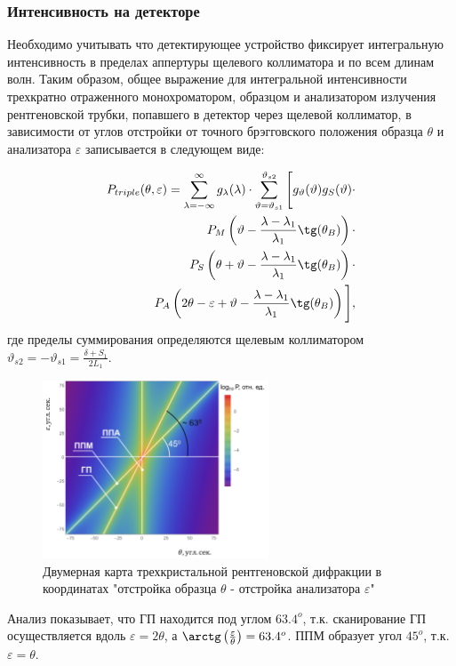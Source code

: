 \subsubsection*{Интенсивность на детекторе}

Необходимо учитывать что детектирующее устройство фиксирует интегральную интенсивность в пределах аппертуры
щелевого коллиматора и по всем длинам волн.
Таким образом, общее выражение для интегральной интенсивности трехкратно отраженного
монохроматором, образцом и анализатором излучения рентгеновской трубки, попавшего в детектор через
щелевой коллиматор, в зависимости от углов отстройки от точного брэгговского положения образца $\theta$ и
анализатора $\varepsilon$ записывается в следующем виде:

\begin{eqnarray} \label{eq:doudle_spectra_angle}
  P_{triple}(\theta,\varepsilon) = \sum_{\lambda = -\infty}^{\infty}g_{\lambda}(\lambda)\cdot
  \sum_{\vartheta = \vartheta_{s1}}^{\vartheta_{s2}} \Bigg[ g_{\vartheta}(\vartheta) g_{S}(\vartheta) \cdot \nonumber \\
    P_M \left(\vartheta - \frac{\lambda - \lambda_1}{\lambda_1}\tg(\theta_B) \right) \cdot \nonumber \\
   P_S \left(\theta + \vartheta - \frac{\lambda - \lambda_1}{\lambda_1}\tg(\theta_B)\right)  \cdot  \nonumber \\
   P_A \left(2\theta - \varepsilon + \vartheta - \frac{\lambda - \lambda_1}{\lambda_1}\tg(\theta_B)\right) \Bigg],
 \end{eqnarray}
 \noindent
где пределы суммирования определяются щелевым коллиматором $\vartheta_{s2} = - \vartheta_{s1} = \frac{\delta+S_1}{2L_1}$.
 \begin{figure}[H]
   \centering
   \includegraphics[width=0.6\textwidth]{images/triple_map_direct_space.png}
   \caption{Двумерная карта трехкристальной рентгеновской дифракции
   в координатах "отстройка образца $\theta$ - отстройка анализатора $\varepsilon$"}
   \label{ris:triple_map_direct_space}
 \end{figure}

Анализ показывает, что ГП находится под углом $63.4^o$, т.к. сканирование ГП осуществляется вдоль $\varepsilon = 2 \theta$,
а $ \arctg \left(\frac{\varepsilon}{\theta} \right) = 63.4^o$. ППМ образует угол $45^o$, т.к. $\varepsilon = \theta$.
